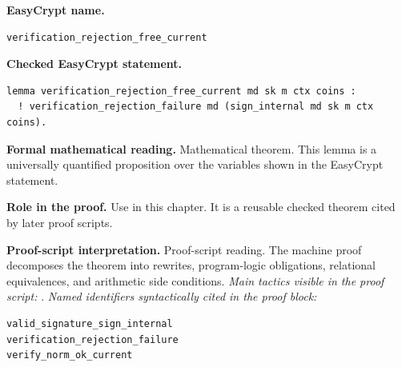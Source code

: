 \begin{formaltheorem}
\noindent\textbf{EasyCrypt name.}
\begin{lstlisting}[language=EasyCrypt,basicstyle=\ttfamily\scriptsize]
verification_rejection_free_current
\end{lstlisting}
\noindent\textbf{Checked EasyCrypt statement.}
\begin{lstlisting}[language=EasyCrypt,basicstyle=\ttfamily\scriptsize]
lemma verification_rejection_free_current md sk m ctx coins :
  ! verification_rejection_failure md (sign_internal md sk m ctx coins).
\end{lstlisting}
\noindent\textbf{Formal mathematical reading.}
Mathematical theorem. This lemma is a universally quantified proposition over the variables shown in the EasyCrypt statement.

\noindent\textbf{Role in the proof.}
Use in this chapter. It is a reusable checked theorem cited by later proof scripts.

\noindent\textbf{Proof-script interpretation.}
Proof-script reading. The machine proof decomposes the theorem into rewrites, program-logic obligations, relational equivalences, and arithmetic side conditions.
\emph{Main tactics visible in the proof script:} .
\emph{Named identifiers syntactically cited in the proof block:}
\begin{lstlisting}[language=EasyCrypt,basicstyle=\ttfamily\scriptsize]
valid_signature_sign_internal
verification_rejection_failure
verify_norm_ok_current
\end{lstlisting}

\end{formaltheorem}

